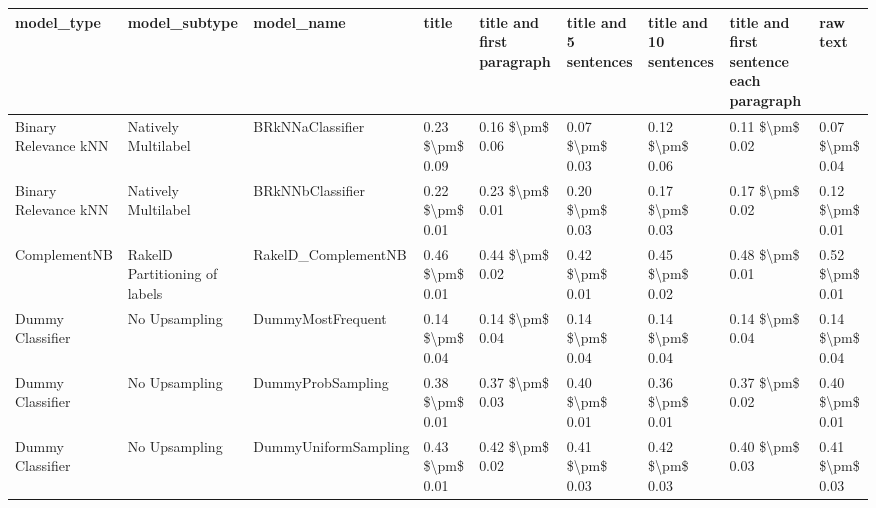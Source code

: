 \begin{tabular}{lllllllll}
\toprule
                     model\_type &                 model\_subtype &                                   model\_name &           title & title and first paragraph & title and 5 sentences & title and 10 sentences & title and first sentence each paragraph &            raw text \\
\midrule
           Binary Relevance kNN &           Natively Multilabel &                             BRkNNaClassifier & 0.23 \$\textbackslash pm\$ 0.09 &           0.16 \$\textbackslash pm\$ 0.06 &       0.07 \$\textbackslash pm\$ 0.03 &        0.12 \$\textbackslash pm\$ 0.06 &                         0.11 \$\textbackslash pm\$ 0.02 &     0.07 \$\textbackslash pm\$ 0.04 \\
           Binary Relevance kNN &           Natively Multilabel &                             BRkNNbClassifier & 0.22 \$\textbackslash pm\$ 0.01 &           0.23 \$\textbackslash pm\$ 0.01 &       0.20 \$\textbackslash pm\$ 0.03 &        0.17 \$\textbackslash pm\$ 0.03 &                         0.17 \$\textbackslash pm\$ 0.02 &     0.12 \$\textbackslash pm\$ 0.01 \\
                   ComplementNB & RakelD Partitioning of labels &                          RakelD\_ComplementNB & 0.46 \$\textbackslash pm\$ 0.01 &           0.44 \$\textbackslash pm\$ 0.02 &       0.42 \$\textbackslash pm\$ 0.01 &        0.45 \$\textbackslash pm\$ 0.02 &                         0.48 \$\textbackslash pm\$ 0.01 &     0.52 \$\textbackslash pm\$ 0.01 \\
               Dummy Classifier &                 No Upsampling &                            DummyMostFrequent & 0.14 \$\textbackslash pm\$ 0.04 &           0.14 \$\textbackslash pm\$ 0.04 &       0.14 \$\textbackslash pm\$ 0.04 &        0.14 \$\textbackslash pm\$ 0.04 &                         0.14 \$\textbackslash pm\$ 0.04 &     0.14 \$\textbackslash pm\$ 0.04 \\
               Dummy Classifier &                 No Upsampling &                            DummyProbSampling & 0.38 \$\textbackslash pm\$ 0.01 &           0.37 \$\textbackslash pm\$ 0.03 &       0.40 \$\textbackslash pm\$ 0.01 &        0.36 \$\textbackslash pm\$ 0.01 &                         0.37 \$\textbackslash pm\$ 0.02 &     0.40 \$\textbackslash pm\$ 0.01 \\
               Dummy Classifier &                 No Upsampling &                         DummyUniformSampling & 0.43 \$\textbackslash pm\$ 0.01 &           0.42 \$\textbackslash pm\$ 0.02 &       0.41 \$\textbackslash pm\$ 0.03 &        0.42 \$\textbackslash pm\$ 0.03 &                         0.40 \$\textbackslash pm\$ 0.03 &     0.41 \$\textbackslash pm\$ 0.03 \\

\end{tabular}
